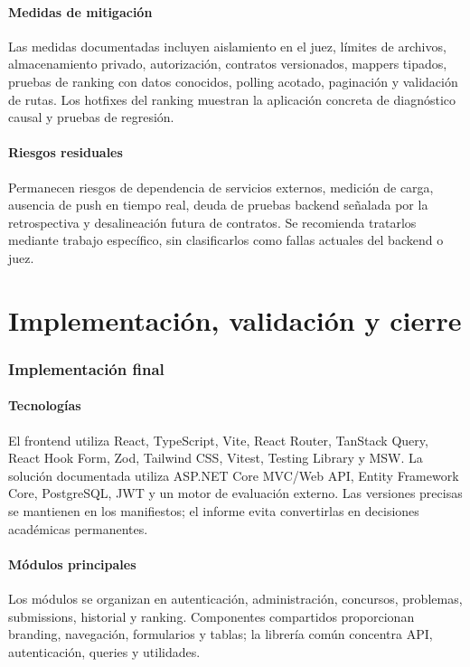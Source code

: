 \documentclass[11pt,a4paper]{article}
\begin{document}
\subsection{Medidas de mitigación}
Las medidas documentadas incluyen aislamiento en el juez, límites de archivos, almacenamiento privado, autorización, contratos versionados, mappers tipados, pruebas de ranking con datos conocidos, polling acotado, paginación y validación de rutas. Los hotfixes del ranking muestran la aplicación concreta de diagnóstico causal y pruebas de regresión.

\subsection{Riesgos residuales}
Permanecen riesgos de dependencia de servicios externos, medición de carga, ausencia de push en tiempo real, deuda de pruebas backend señalada por la retrospectiva y desalineación futura de contratos. Se recomienda tratarlos mediante trabajo específico, sin clasificarlos como fallas actuales del backend o juez.

\part{Implementación, validación y cierre}

\section{Implementación final}

\subsection{Tecnologías}
El frontend utiliza React, TypeScript, Vite, React Router, TanStack Query, React Hook Form, Zod, Tailwind CSS, Vitest, Testing Library y MSW. La solución documentada utiliza ASP.NET Core MVC/Web API, Entity Framework Core, PostgreSQL, JWT y un motor de evaluación externo. Las versiones precisas se mantienen en los manifiestos; el informe evita convertirlas en decisiones académicas permanentes.

\subsection{Módulos principales}
Los módulos se organizan en autenticación, administración, concursos, problemas, submissions, historial y ranking. Componentes compartidos proporcionan branding, navegación, formularios y tablas; la librería común concentra API, autenticación, queries y utilidades.
\end{document}
